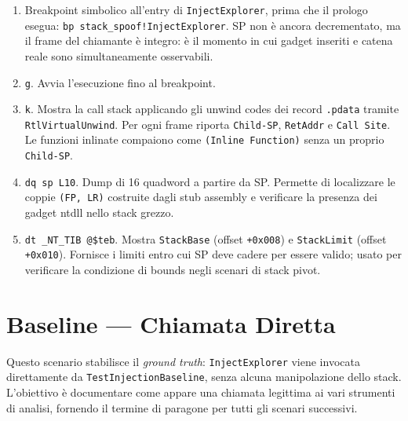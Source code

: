 \begin{enumerate}

  \item Breakpoint simbolico all'entry di \texttt{InjectExplorer}, prima che
        il prologo esegua:
        \texttt{bp stack\_spoof\allowbreak!InjectExplorer}.
        SP non è ancora decrementato, ma il frame del chiamante è integro:
        è il momento in cui gadget inseriti e catena reale sono
        simultaneamente osservabili.

  \item \texttt{g}. Avvia l'esecuzione fino al breakpoint.

  \item \texttt{k}. Mostra la call stack applicando gli unwind codes dei
        record \texttt{.pdata} tramite \texttt{RtlVirtualUnwind}. Per ogni
        frame riporta \texttt{Child-SP}, \texttt{RetAddr} e
        \texttt{Call Site}. Le funzioni inlinate compaiono come
        \texttt{(Inline Function)} senza un proprio \texttt{Child-SP}.

  \item \texttt{dq sp L10}. Dump di 16 quadword a partire da SP.
        Permette di localizzare le coppie \texttt{(FP, LR)} costruite
        dagli stub assembly e verificare la presenza dei gadget ntdll
        nello stack grezzo.

  \item \texttt{dt \_NT\_TIB @\$teb}. Mostra \texttt{StackBase}
        (offset \texttt{+0x008}) e \texttt{StackLimit} (offset \texttt{+0x010}).
        Fornisce i limiti entro cui SP deve cadere per essere valido;
        usato per verificare la condizione di bounds negli scenari di
        stack pivot.

\end{enumerate}


\section{Baseline — Chiamata Diretta}
\label{sec:sc1}

Questo scenario stabilisce il \emph{ground truth}: \texttt{InjectExplorer}
viene invocata direttamente da \texttt{TestInjectionBaseline}, senza alcuna
manipolazione dello stack. L'obiettivo è documentare come appare una chiamata
legittima ai vari strumenti di analisi, fornendo il termine di paragone per
tutti gli scenari successivi.

